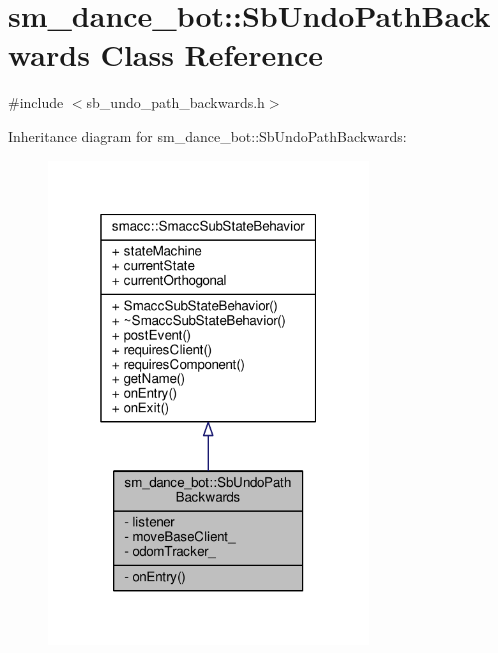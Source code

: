\hypertarget{classsm__dance__bot_1_1SbUndoPathBackwards}{}\section{sm\+\_\+dance\+\_\+bot\+:\+:Sb\+Undo\+Path\+Backwards Class Reference}
\label{classsm__dance__bot_1_1SbUndoPathBackwards}


{\ttfamily \#include $<$sb\+\_\+undo\+\_\+path\+\_\+backwards.\+h$>$}



Inheritance diagram for sm\+\_\+dance\+\_\+bot\+:\+:Sb\+Undo\+Path\+Backwards\+:
\nopagebreak
\begin{figure}[H]
\begin{center}
\leavevmode
\includegraphics[width=241pt]{classsm__dance__bot_1_1SbUndoPathBackwards__inherit__graph}
\end{center}
\end{figure}


